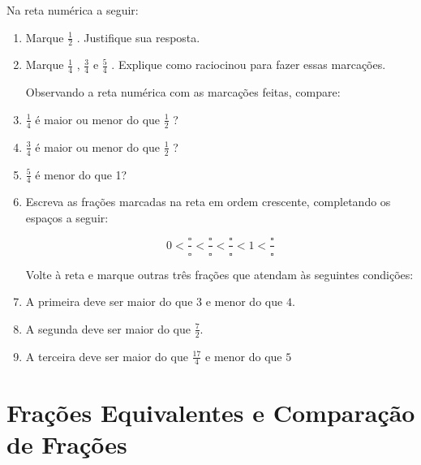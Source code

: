 \documentclass[a4,12pt]{book}
\begin{document}
Na reta numérica a seguir:
\begin{enumerate} [\quad a)] %
  \item     Marque     $\frac{1}{2}$    . Justifique sua resposta.
  \item     Marque     $\frac{1}{4}$    ,     $\frac{3}{4}$     e     $\frac{5}{4}$    . Explique como raciocinou para fazer essas marcações. 
  
\begin{center}
\end{center}

Observando a reta numérica com as marcações feitas, compare: 

  \item $\frac{1}{4}$     é maior ou menor do que     $\frac{1}{2}$    ? 
  \item $\frac{3}{4}$ é maior ou menor do que $\frac{1}{2}$    ?
  \item $\frac{5}{4}$  é menor do que 1?
  \item Escreva as frações marcadas na reta em ordem crescente, completando os espaços a seguir:

$$0 < \frac{\square}{\square} < \frac{\square}{\square}< \frac{\square}{\square} < 1 < \frac{\square}{\square}$$

Volte à reta e marque outras três frações que atendam às seguintes condições: 
  \item A primeira deve ser maior do que $3$ e menor do que $4$.
 \item A segunda deve ser maior do que $\frac{7}{2}$.
 \item A terceira deve ser maior do que $\frac{17}{4}$ e menor do que $5$

\end{enumerate} %




\chapter{Frações Equivalentes e Comparação de Frações }
\setcounter{subsection}{0}
\end{document}
